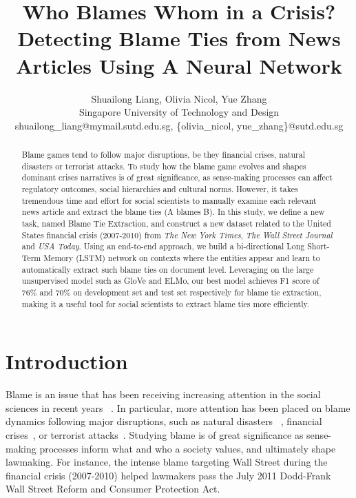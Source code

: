 \documentclass[letterpaper]{article}
\begin{document}
\title{Who Blames Whom in a Crisis? Detecting Blame Ties from News Articles Using A Neural Network}
\author{Shuailong Liang, Olivia Nicol, Yue Zhang\\ 
		Singapore University of Technology and Design \\
		shuailong\_liang@mymail.sutd.edu.sg,
		\{olivia\_nicol, yue\_zhang\}@sutd.edu.sg
}
\maketitle
\begin{abstract}
Blame games tend to follow major disruptions, be they financial crises, natural disasters or terrorist attacks. To study how the blame game evolves and shapes dominant crises narratives is of great significance, as sense-making processes can affect regulatory outcomes, social hierarchies and cultural norms. However, it takes tremendous time and effort for social scientists to manually examine each relevant news article and extract the blame ties (A blames B). In this study, we define a new task, named Blame Tie Extraction, and construct a new dataset related to the United States financial crisis (2007-2010) from {\it The New York Times}, {\it The Wall Street Journal} and {\it USA Today}. Using an end-to-end approach, we build a bi-directional Long Short-Term Memory (LSTM) network on contexts where the entities appear and learn to automatically extract such blame ties on document level. Leveraging on the large unsupervised model such as GloVe and ELMo, our best model achieves F1 score of 76\% and 70\% on development set and test set respectively for blame tie extraction, making it a useful tool for social scientists to extract blame ties more efficiently.
\end{abstract}

\section{Introduction}

Blame is an issue that has been receiving increasing attention in the social sciences in recent years ~\cite{alicke2000culpable,mary1992risk,farmer2006aids,gephart1993textual,hobolt2014blaming,hood2010blame,shaver2012attribution,tilly2009credit}. In particular, more attention has been placed on blame dynamics following major disruptions, such as natural disasters ~\cite{boin2010leadership,malhotra2008attributing}, financial crises~\cite{nicolno,tourish2012metaphors}, or terrorist attacks~\cite{olmeda2008reversal}. Studying blame is of great significance as sense-making processes inform what and who a society values, and ultimately shape lawmaking. For instance, the intense blame targeting Wall Street during the financial crisis (2007-2010) helped lawmakers pass the July 2011 Dodd-Frank Wall Street Reform and Consumer Protection Act.
\end{document}
